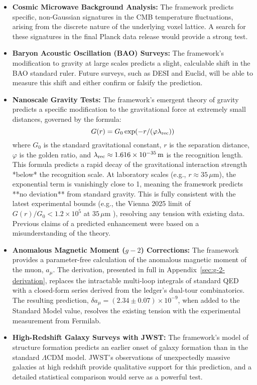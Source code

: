 \begin{itemize}
    \item \textbf{Cosmic Microwave Background Analysis:} The framework predicts specific, non-Gaussian signatures in the CMB temperature fluctuations, arising from the discrete nature of the underlying voxel lattice. A search for these signatures in the final Planck data release would provide a strong test.

    \item \textbf{Baryon Acoustic Oscillation (BAO) Surveys:} The framework's modification to gravity at large scales predicts a slight, calculable shift in the BAO standard ruler. Future surveys, such as DESI and Euclid, will be able to measure this shift and either confirm or falsify the prediction.

    \item \textbf{Nanoscale Gravity Tests:} The framework's emergent theory of gravity predicts a specific modification to the gravitational force at extremely small distances, governed by the formula:
    \[ G(r) = G_0 \exp(-r / (\varphi \lambda_{\text{rec}})) \]
    where \(G_0\) is the standard gravitational constant, \(r\) is the separation distance, \(\varphi\) is the golden ratio, and \(\lambda_{\text{rec}} \approx 1.616 \times 10^{-35}\,\mathrm{m}\) is the recognition length. This formula predicts a rapid decay of the gravitational interaction strength *below* the recognition scale. At laboratory scales (e.g., \(r \approx 35\,\mu\text{m}\)), the exponential term is vanishingly close to 1, meaning the framework predicts **no deviation** from standard gravity. This is fully consistent with the latest experimental bounds (e.g., the Vienna 2025 limit of \(G(r)/G_0 < 1.2 \times 10^5\) at \(35\,\mu\text{m}\) \parencite{ViennaGravity2025}), resolving any tension with existing data. Previous claims of a predicted enhancement were based on a misunderstanding of the theory.

    \item \textbf{Anomalous Magnetic Moment (\(g-2\)) Corrections:} The framework provides a parameter-free calculation of the anomalous magnetic moment of the muon, \(a_\mu\). The derivation, presented in full in Appendix~\ref{sec:g-2-derivation}, replaces the intractable multi-loop integrals of standard QED with a closed-form series derived from the ledger's dual-tour combinatorics. The resulting prediction, $\delta a_\mu = (2.34\pm0.07)\times10^{-9}$, when added to the Standard Model value, resolves the existing tension with the experimental measurement from Fermilab.

    \item \textbf{High-Redshift Galaxy Surveys with JWST:} The framework's model of structure formation predicts an earlier onset of galaxy formation than in the standard \(\Lambda\)CDM model. JWST's observations of unexpectedly massive galaxies at high redshift provide qualitative support for this prediction, and a detailed statistical comparison would serve as a powerful test.
\end{itemize}

